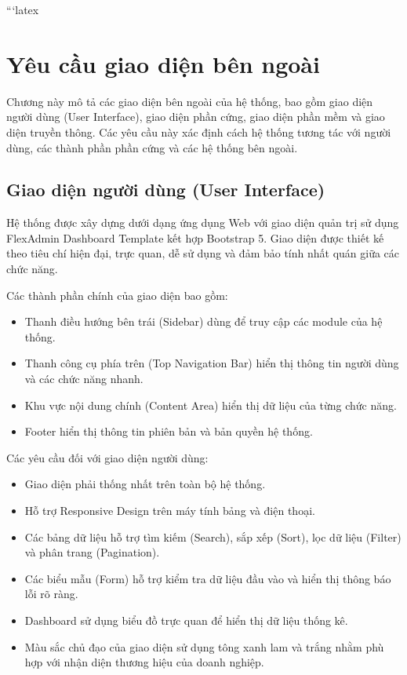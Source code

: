 ```latex
\chapter{Yêu cầu giao diện bên ngoài}

Chương này mô tả các giao diện bên ngoài của hệ thống, bao gồm giao diện người dùng (User Interface), giao diện phần cứng, giao diện phần mềm và giao diện truyền thông. Các yêu cầu này xác định cách hệ thống tương tác với người dùng, các thành phần phần cứng và các hệ thống bên ngoài.

\section{Giao diện người dùng (User Interface)}

Hệ thống được xây dựng dưới dạng ứng dụng Web với giao diện quản trị sử dụng FlexAdmin Dashboard Template kết hợp Bootstrap 5. Giao diện được thiết kế theo tiêu chí hiện đại, trực quan, dễ sử dụng và đảm bảo tính nhất quán giữa các chức năng.

Các thành phần chính của giao diện bao gồm:

\begin{itemize}
    \item Thanh điều hướng bên trái (Sidebar) dùng để truy cập các module của hệ thống.
    \item Thanh công cụ phía trên (Top Navigation Bar) hiển thị thông tin người dùng và các chức năng nhanh.
    \item Khu vực nội dung chính (Content Area) hiển thị dữ liệu của từng chức năng.
    \item Footer hiển thị thông tin phiên bản và bản quyền hệ thống.
\end{itemize}

Các yêu cầu đối với giao diện người dùng:

\begin{itemize}
    \item Giao diện phải thống nhất trên toàn bộ hệ thống.
    \item Hỗ trợ Responsive Design trên máy tính bảng và điện thoại.
    \item Các bảng dữ liệu hỗ trợ tìm kiếm (Search), sắp xếp (Sort), lọc dữ liệu (Filter) và phân trang (Pagination).
    \item Các biểu mẫu (Form) hỗ trợ kiểm tra dữ liệu đầu vào và hiển thị thông báo lỗi rõ ràng.
    \item Dashboard sử dụng biểu đồ trực quan để hiển thị dữ liệu thống kê.
    \item Màu sắc chủ đạo của giao diện sử dụng tông xanh lam và trắng nhằm phù hợp với nhận diện thương hiệu của doanh nghiệp.
\end{itemize}

